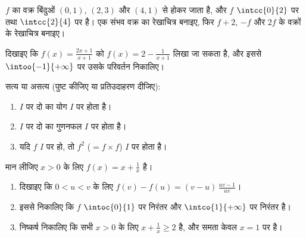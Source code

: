 \begin{exercise}[$\star\star$]\label{exo:g11:func:8}
 $f$ का वक्र बिंदुओं $(0, 1)$, $(2, 3)$ और $(4, 1)$ से होकर जाता है, और $f$
$\intcc{0}{2}$ पर  तथा $\intcc{2}{4}$ पर  है। एक संभव वक्र का रेखाचित्र बनाइए,
फिर $f + 2$, $-f$ और $2f$ के वक्रों के रेखाचित्र बनाइए।
\end{exercise}

\begin{exercise}[$\star\star$]\label{exo:g11:func:9}
दिखाइए कि  $f(x) = \frac{2x+1}{x+1}$ को $f(x) = 2 - \frac{1}{x+1}$ लिखा जा सकता है, और इससे $\intoo{-1}{+\infty}$ पर उसके
परिवर्तन निकालिए।
\end{exercise}

\begin{exercise}[$\star\star$]\label{exo:g11:func:10}
सत्य या असत्य (पुष्ट कीजिए या प्रतिउदाहरण दीजिए):
\begin{enumerate}
  \item $I$ पर दो  का योग $I$ पर  होता है।
  \item $I$ पर दो  का गुणनफल $I$ पर  होता है।
  \item यदि $f$ $I$ पर  हो, तो $f^2$ ($= f \times f$) $I$ पर 
        होता है।
\end{enumerate}
\end{exercise}

\begin{exercise}[$\star\star\star$]\label{exo:g11:func:11}
मान लीजिए $x > 0$ के लिए $f(x) = x + \frac{1}{x}$ है।
\begin{enumerate}
  \item दिखाइए कि $0 < u < v$ के लिए $f(v) - f(u) = (v - u)\,\frac{uv - 1}{uv}$।
  \item इससे निकालिए कि $f$ $\intoc{0}{1}$ पर निरंतर  और $\intco{1}{+\infty}$ पर निरंतर
         है।
  \item निष्कर्ष निकालिए कि सभी $x > 0$ के लिए $x + \frac1x \geq 2$ है, और समता केवल $x = 1$
        पर है।
\end{enumerate}
\end{exercise}

